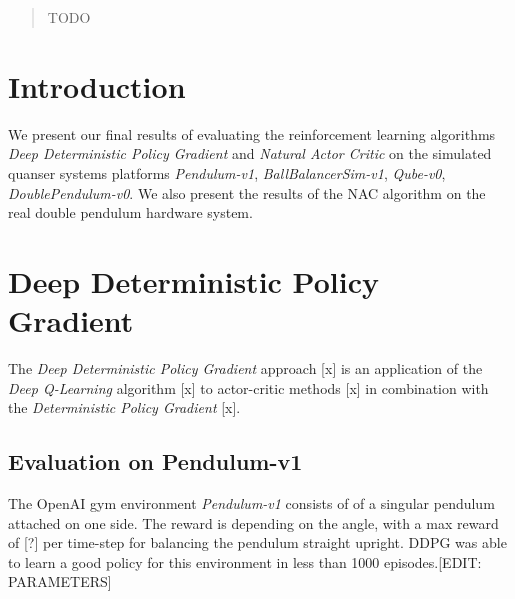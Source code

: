 \author{Yannik Frisch \and Tabea Wilke \and Maximilian Gehrke %
}



\date{Received: date / Accepted: date}


\maketitle

\begin{abstract}
TODO
\end{abstract}

\section{Introduction}
\label{sec:intro}
We present our final results of evaluating the reinforcement learning algorithms \textit{Deep Deterministic Policy Gradient} and \textit{Natural Actor Critic} on the simulated quanser systems platforms \textit{Pendulum-v1}, \textit{BallBalancerSim-v1}, \textit{Qube-v0}, \textit{DoublePendulum-v0}. We also present the results of the NAC algorithm on the real double pendulum hardware system.
\newpage
\section{Deep Deterministic Policy Gradient}
\label{sec:ddpg}
The \textit{Deep Deterministic Policy Gradient} approach [x] is an application of the \textit{Deep Q-Learning} algorithm [x] to actor-critic methods [x] in combination with the \textit{Deterministic Policy Gradient} [x]. 
\subsection{Evaluation on Pendulum-v1}
The OpenAI gym environment \textit{Pendulum-v1} consists of of a singular pendulum attached on one side. The reward is depending on the angle, with a max reward of [?] per time-step for balancing the pendulum straight upright. DDPG was able to learn a good policy for this environment in less than 1000 episodes.[EDIT: PARAMETERS]\\

